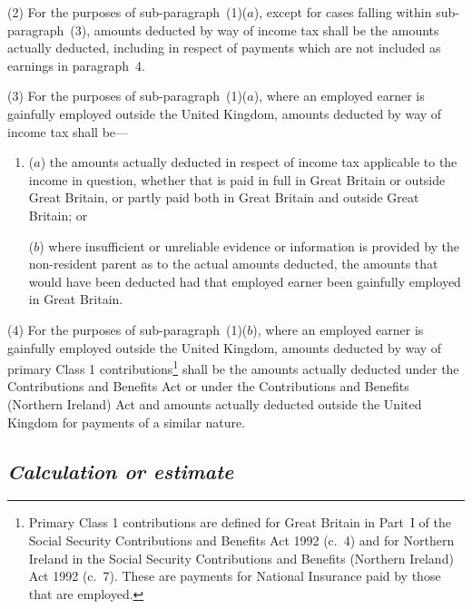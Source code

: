 \documentclass[12pt,a4paper]{article}
\begin{document}
(2) For the purposes of sub-paragraph~(1)($a$), 
except for cases falling within sub-paragraph~(3),  %
amounts deducted by way of income tax shall be the amounts actually deducted, including in respect of payments which are not included as earnings in paragraph~4.

(3) For the purposes of sub-paragraph~(1)($a$), where an employed earner is gainfully employed outside the United Kingdom, amounts deducted by way of income tax shall be---
\begin{enumerate}\item[]
($a$) the amounts actually deducted in respect of income tax applicable to the income in question, whether that is paid in full in Great Britain or outside Great Britain, or partly paid both in Great Britain and outside Great Britain; or

($b$) where insufficient or unreliable evidence or information is provided by the non-resident parent as to the actual amounts deducted, the amounts that would have been deducted had that employed earner been gainfully employed in Great Britain.
\end{enumerate}

(4) For the purposes of sub-paragraph~(1)($b$), where an employed earner is gainfully employed outside the United Kingdom, amounts deducted by way of primary Class 1 contributions\footnote{Primary Class 1 contributions are defined for Great Britain in Part~I of the Social Security Contributions and Benefits Act 1992 (c.~4) and for Northern Ireland in the Social Security Contributions and Benefits (Northern Ireland) Act 1992 (c.~7). These are payments for National Insurance paid by those that are employed.} shall be the amounts actually deducted under the Contributions and Benefits Act or under the Contributions and Benefits (Northern Ireland) Act and amounts actually deducted outside the United Kingdom for payments of a similar nature.


\subsection*{\itshape Calculation or estimate}
\end{document}
